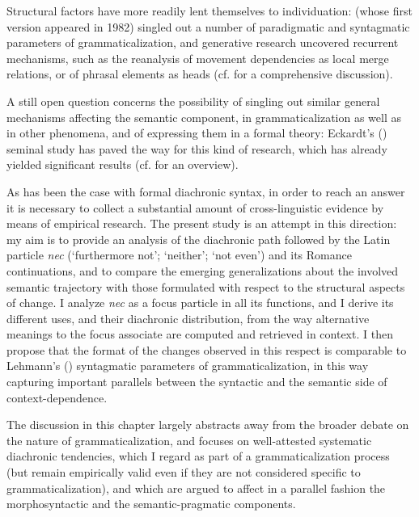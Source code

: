 \documentclass[output=paper,modfonts,nonflat,citecolor=brown,
showindex
]{langsci/langscibook}
\begin{document}
Structural factors have more readily lent themselves to individuation: \linebreak \citet[]{Lehmann15} (whose first version appeared in 1982) singled out a number of paradigmatic and syntagmatic parameters of grammaticalization, and \linebreak generative research uncovered recurrent mechanisms, such as the reanalysis of movement dependencies as local merge relations, or of phrasal elements as heads (cf. \citealt[]{RobertsRoussou03, Gelderen04a} for a comprehensive discussion).

A still open question concerns the possibility of singling out similar general mechanisms affecting the semantic component, in grammaticalization as well as in other phenomena, and of expressing them in a formal theory: Eckardt's (\citeyear{Eckardt06}) seminal study has paved the way for this kind of research, which has already yielded significant results (cf. \citealt[]{Eckardt12, Deo15, Gianolloetal15} for an overview).

As has been the case with formal diachronic syntax, in order to reach an answer it is necessary to collect a substantial amount of cross-linguistic evidence by means of empirical research. The present study is an attempt in this direction: my aim is to provide an analysis of the diachronic path followed by the Latin particle {\emph{nec}} (`furthermore not'; `neither'; `not even') and its Romance continuations, and to compare the emerging generalizations about the involved semantic trajectory with those formulated with respect to the structural aspects of change. I analyze {\emph{nec}} as a focus particle in all its functions, and I derive its different uses, and their diachronic distribution, from the way alternative meanings to the focus associate are computed and retrieved in context. I then propose that the format of the changes observed in this respect is comparable to Lehmann's (\citeyear[]{Lehmann15}) syntagmatic parameters of grammaticalization, in this way capturing important parallels between the syntactic and the semantic side of context-dependence.

The discussion in this chapter largely abstracts away from the broader debate on the nature of grammaticalization, and focuses on well-attested systematic diachronic tendencies, which I regard as part of a grammaticalization process (but remain empirically valid even if they are not considered specific to grammaticalization), and which are argued to affect in a parallel fashion the morphosyntactic and the semantic-pragmatic components.
\end{document}
